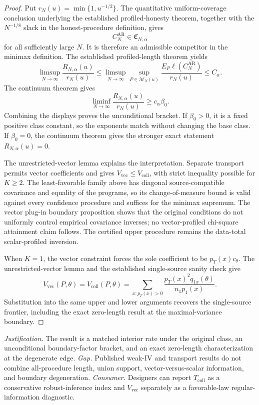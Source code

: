 \documentclass{article}
\begin{document}
\begin{proof}
Put \(r_N(u)=\min\{1,u^{-1/2}\}\). The quantitative uniform-coverage conclusion underlying the established profiled-honesty theorem, together with the \(N^{-1/8}\) slack in the honest-procedure definition, gives
\[
C_N^{\mathrm{AR}}\in\mathfrak C_{N,\alpha}
\]
for all sufficiently large \(N\). It is therefore an admissible competitor in the minimax definition. The established profiled-length theorem yields
\[
\limsup_{N\to\infty}\frac{R_{N,\alpha}(u)}{r_N(u)}
\le
\limsup_{N\to\infty}\sup_{P\in\mathcal M_N(u)}
\frac{E_P\ell(C_N^{\mathrm{AR}})}{r_N(u)}
\le C_\alpha.
\]
The continuum theorem gives
\[
\liminf_{N\to\infty}\frac{R_{N,\alpha}(u)}{r_N(u)}
\ge c_\alpha\beta_0.
\]
Combining the displays proves the unconditional bracket. If \(\beta_0>0\), it is a fixed positive class constant, so the exponents match without changing the base class. If \(\beta_0=0\), the continuum theorem gives the stronger exact statement \(R_{N,\alpha}(u)=0\).

The unrestricted-vector lemma explains the interpretation. Separate transport permits vector coefficients and gives \(V_{\mathrm{vec}}\le V_{\mathrm{coll}}\), with strict inequality possible for \(K\ge2\). The least-favorable family above has diagonal source-compatible covariance and equality of the programs, so its change-of-measure bound is valid against every confidence procedure and suffices for the minimax supremum. The vector plug-in boundary proposition shows that the original conditions do not uniformly control empirical covariance inverses; no vector-profiled chi-square attainment claim follows. The certified upper procedure remains the data-total scalar-profiled inversion.

When \(K=1\), the vector constraint forces the sole coefficient to be \(p_T(x)c_\theta\). The unrestricted-vector lemma and the established single-source sanity check give
\[
V_{\mathrm{vec}}(P,\theta)=V_{\mathrm{coll}}(P,\theta)
=\sum_{x:p_T(x)>0}
\frac{p_T(x)^2q_{1x}(\theta)}{n_1p_1(x)}.
\]
Substitution into the same upper and lower arguments recovers the single-source frontier, including the exact zero-length result at the maximal-variance boundary.
\end{proof}
\par\smallskip\noindent \textit{Justification.} The result is a matched interior rate under the original class, an unconditional boundary-factor bracket, and an exact zero-length characterization at the degenerate edge. \textit{Gap.} Published weak-IV and transport results do not combine all-procedure length, union support, vector-versus-scalar information, and boundary degeneration. \textit{Consumer.} Designers can report \(T_{\mathrm{coll}}\) as a conservative robust-inference index and \(V_{\mathrm{vec}}\) separately as a favorable-law regular-information diagnostic.
\end{document}
